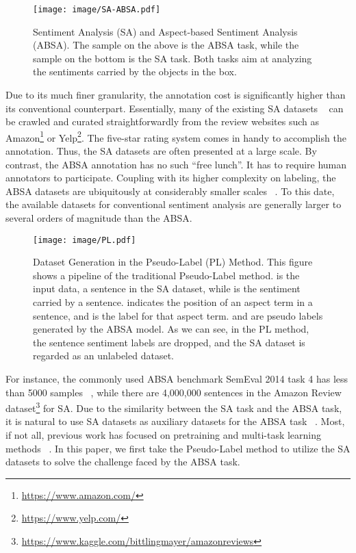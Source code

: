 \documentclass[11pt]{article}
\begin{document}
\begin{figure}
  \centering
  \texttt{[image: image/SA-ABSA.pdf]}
  \caption{Sentiment Analysis (SA) and Aspect-based Sentiment Analysis (ABSA). The sample on the above is the ABSA task, while the sample on the bottom is the SA task. Both tasks aim at analyzing the sentiments carried by the objects in the box.}
  \label{fig:sa-absa}
\end{figure}

Due to its much finer granularity, the annotation cost is significantly higher than its conventional counterpart. Essentially, many of the existing SA datasets ~\cite{he2018exploiting} can be crawled and curated straightforwardly from the review websites such as Amazon\footnote{\url{https://www.amazon.com/}} or Yelp\footnote{\url{https://www.yelp.com/}}. The five-star rating system comes in handy to accomplish the annotation. Thus, the SA datasets are often presented at a large scale.
By contrast, the ABSA annotation has no such ``free lunch''. It has to require human annotators to participate. Coupling with its higher complexity on labeling, the ABSA datasets are ubiquitously at considerably smaller scales ~\cite{pontikisemeval,he2018exploiting,yu2021cross}.
To this date, the available datasets for conventional sentiment analysis are generally larger to several orders of magnitude than the ABSA. 
\begin{figure*}
  \centering
  \texttt{[image: image/PL.pdf]} 
  \caption{Dataset Generation in the Pseudo-Label (PL) Method.
  This figure shows a pipeline of the traditional Pseudo-Label method.
   is the input data, a sentence in the SA dataset, while  is the sentiment carried by a sentence.  indicates the position of an aspect term in a sentence, and  is the label for that aspect term.  and  are pseudo labels generated by the ABSA model.
  As we can see, in the PL method, the sentence sentiment labels are dropped, and the SA dataset is regarded as an unlabeled dataset.}
  \label{fig:pl}
\end{figure*}

For instance, the commonly used ABSA benchmark SemEval 2014 task 4 has less than 5000 samples ~\cite{pontikisemeval}, while there are 4,000,000 sentences in the Amazon Review dataset\footnote{\url{https://www.kaggle.com/bittlingmayer/amazonreviews}} for SA.
Due to the similarity between the SA task and the ABSA task, it is natural to use SA datasets as auxiliary datasets for the ABSA task ~\cite{he2018exploiting}. 
Most, if not all,  previous work has focused on pretraining and multi-task learning methods ~\cite{he2018exploiting,he2019interactive}.
In this paper, we first take the Pseudo-Label method to utilize the SA datasets to solve the challenge faced by the ABSA task.
\end{document}

